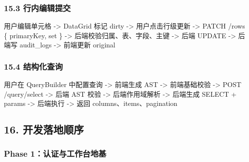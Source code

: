 \documentclass[
  a4paper,
  UTF8]{ctexart}
\newenvironment{Shaded}{}{}
\newcommand{\NormalTok}[1]{#1}
\begin{document}
\hypertarget{ux884cux5185ux7f16ux8f91ux63d0ux4ea4}{%
\subsubsection{15.3
行内编辑提交}\label{ux884cux5185ux7f16ux8f91ux63d0ux4ea4}}

\begin{Shaded}
\begin{Highlighting}[]
\NormalTok{用户编辑单元格}
\NormalTok{  {-}\textgreater{} DataGrid 标记 dirty}
\NormalTok{  {-}\textgreater{} 用户点击行级更新}
\NormalTok{  {-}\textgreater{} PATCH /rows \{ primaryKey, set \}}
\NormalTok{  {-}\textgreater{} 后端校验归属、表、字段、主键}
\NormalTok{  {-}\textgreater{} 后端 UPDATE}
\NormalTok{  {-}\textgreater{} 后端写 audit\_logs}
\NormalTok{  {-}\textgreater{} 前端更新 original}
\end{Highlighting}
\end{Shaded}

\hypertarget{ux7ed3ux6784ux5316ux67e5ux8be2}{%
\subsubsection{15.4 结构化查询}\label{ux7ed3ux6784ux5316ux67e5ux8be2}}

\begin{Shaded}
\begin{Highlighting}[]
\NormalTok{用户在 QueryBuilder 中配置查询}
\NormalTok{  {-}\textgreater{} 前端生成 AST}
\NormalTok{  {-}\textgreater{} 前端基础校验}
\NormalTok{  {-}\textgreater{} POST /query/select}
\NormalTok{  {-}\textgreater{} 后端 AST 校验}
\NormalTok{  {-}\textgreater{} 后端作用域解析}
\NormalTok{  {-}\textgreater{} 后端生成 SELECT + params}
\NormalTok{  {-}\textgreater{} 后端执行}
\NormalTok{  {-}\textgreater{} 返回 columns、items、pagination}
\end{Highlighting}
\end{Shaded}

\hypertarget{ux5f00ux53d1ux843dux5730ux987aux5e8f}{%
\subsection{16.
开发落地顺序}\label{ux5f00ux53d1ux843dux5730ux987aux5e8f}}

\hypertarget{phase-1ux8ba4ux8bc1ux4e0eux5de5ux4f5cux53f0ux5730ux57fa}{%
\subsubsection{Phase
1：认证与工作台地基}\label{phase-1ux8ba4ux8bc1ux4e0eux5de5ux4f5cux53f0ux5730ux57fa}}
\end{document}
